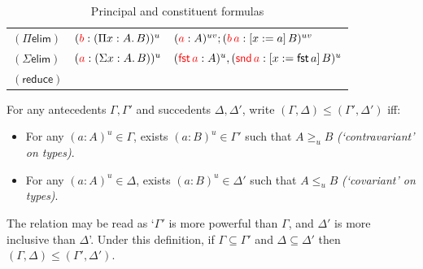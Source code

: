 \documentclass[twoside]{report}
\begin{document}
\begin{table}[ht]
\begin{tabular}{lll}
        $(\Pi\mathsf{elim})$     & $(\textcolor{red}{b} : (\Pi{x} : {A}.\,{B}))^u$                           & $(\textcolor{red}{a} : A)^{uv}; (\textcolor{red}{{b}\,{a}} : [{x}:={a}]\,{B})^{uv}$                                     \\
        $(\Sigma\mathsf{elim})$  & $(\textcolor{red}{a} : (\Sigma{x} : {A}.\,{B}))^u$                           & $(\textcolor{red}{\operatorname{\mathsf{fst}} a} : A)^u, (\textcolor{red}{\operatorname{\mathsf{snd}} a} : [{x}:={\operatorname{\mathsf{fst}} a}]\,{B})^u$                                 \\
        $(\mathsf{reduce})$      &                                                                   &                                                                                                                     \\\hline
    \end{tabular}
    \caption{Principal and constituent formulas}
    \label{tab:sequent_calculi_principal_and_constituent_formulas}
\end{table}



\begin{definition}
    \label{def:sequent_calculi_ordering}
    For any antecedents $\Gamma, \Gamma'$ and succedents $\Delta, \Delta'$, write $(\Gamma, \Delta) \leq (\Gamma', \Delta')$ iff:
    \begin{itemize}[noitemsep]
        \item For any $(a : A)^u \in \Gamma$, exists $(a : B)^u \in \Gamma'$ such that $A \geq_u B$ \emph{(`contravariant' on types)}.
        \item For any $(a : A)^u \in \Delta$, exists $(a : B)^u \in \Delta'$ such that $A \leq_u B$ \emph{(`covariant' on types)}.
    \end{itemize}
\end{definition}

The relation may be read as `$\Gamma'$ is more powerful than $\Gamma$, and $\Delta'$ is more inclusive than $\Delta$'. Under this definition, if $\Gamma \subseteq \Gamma'$ and $\Delta \subseteq \Delta'$ then $(\Gamma, \Delta) \leq (\Gamma', \Delta')$.
\end{document}
